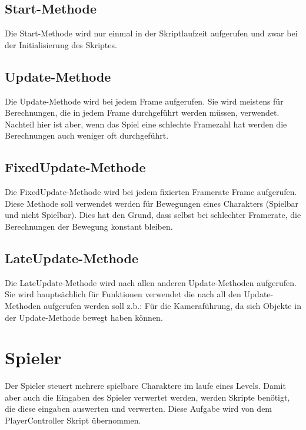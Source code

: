 \subsection{Start-Methode}
Die Start-Methode wird nur einmal in der Skriptlaufzeit aufgerufen und zwar bei der Initialisierung des Skriptes.
\subsection{Update-Methode}
Die Update-Methode wird bei jedem Frame aufgerufen. Sie wird meistens für Berechnungen, die in jedem Frame durchgeführt werden müssen, verwendet. Nachteil hier ist aber, wenn das Spiel eine schlechte Framezahl hat werden die Berechnungen auch weniger oft durchgeführt.
\subsection{FixedUpdate-Methode}
Die FixedUpdate-Methode wird bei jedem fixierten Framerate Frame aufgerufen. Diese Methode soll verwendet werden für Bewegungen eines Charakters (Spielbar und nicht Spielbar). Dies hat den Grund, dass selbst bei schlechter Framerate, die Berechnungen der Bewegung konstant bleiben.
\subsection{LateUpdate-Methode}
Die LateUpdate-Methode wird nach allen anderen Update-Methoden aufgerufen. Sie wird hauptsächlich für Funktionen verwendet die nach all den Update-Methoden aufgerufen werden soll z.b.: Für die Kameraführung, da sich Objekte in der Update-Methode bewegt haben können.
\section{Spieler}
Der Spieler steuert mehrere spielbare Charaktere im laufe  eines Levels. Damit aber auch die Eingaben des Spieler verwertet werden, werden Skripte benötigt, die diese eingaben auswerten und verwerten. Diese Aufgabe wird von dem PlayerController Skript übernommen. 
